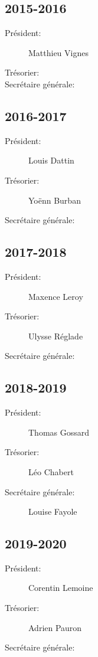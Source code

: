 \documentclass[a4paper, 11pt]{report}
\begin{document}
\subsection{2015-2016}
\begin{description}
\item[Président:] Matthieu Vignes
\item[Trésorier:] 
\item[Secrétaire générale:]
\end{description}

\subsection{2016-2017}
\begin{description}
\item[Président:] Louis Dattin
\item[Trésorier:] Yoënn Burban
\item[Secrétaire générale:] 
\end{description}

\subsection{2017-2018}
\begin{description}
\item[Président:] Maxence Leroy
\item[Trésorier:] Ulysse Réglade
\item[Secrétaire générale:] 
\end{description}

\subsection{2018-2019}
\begin{description}
\item[Président:] Thomas Gossard
\item[Trésorier:] Léo Chabert
\item[Secrétaire générale:] Louise Fayole
\end{description}

\subsection{2019-2020}
\begin{description}
\item[Président:] Corentin Lemoine
\item[Trésorier:] Adrien Pauron
\item[Secrétaire générale:]
\end{description}
\end{document}
